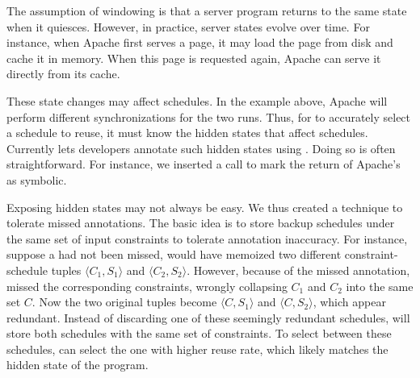   The assumption of windowing is that a
server program returns to the same state when it quiesces.  However, in
practice, server states evolve over time.  For instance, when Apache first
serves a page, it may load the page from disk and cache it in memory.
When this page is requested again, Apache can serve it directly from its
cache.

These state changes may affect schedules.  In the example above, Apache
will perform different synchronizations for the two runs.  Thus, for
\tern to accurately select a schedule to reuse, it must know the hidden
states that affect schedules.  Currently \tern lets developers annotate
such hidden states using .  Doing so is often
straightforward.  For instance, we inserted a  call to mark
the return of Apache's  as symbolic.

Exposing hidden states may not always be easy.  We thus created a
technique to tolerate missed  annotations.  The basic idea
is to store backup schedules under the same set of input constraints to
tolerate annotation inaccuracy.  For instance, suppose a 
had not been missed, \tern would have memoized two different
constraint-schedule tuples $\langle C_1, S_1 \rangle$ and $\langle C_2,
S_2 \rangle$.  However, because of the missed annotation, \tern missed the
corresponding constraints, wrongly collapsing $C_1$ and $C_2$ into the
same set $C$.  Now the two original tuples become $\langle C, S_1 \rangle$
and $\langle C, S_2 \rangle$, which appear redundant.  Instead of
discarding one of these seemingly redundant schedules, \tern will store both
schedules with the same set of constraints.  To select between these
schedules, \tern can select the one with higher reuse rate, which likely
matches the hidden state of the program.

